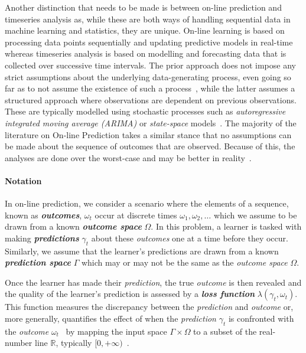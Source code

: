 Another distinction that needs to be made is between on-line prediction and timeseries analysis as, while these are both ways of handling sequential data in machine learning and statistics, they are unique. On-line learning is based on processing data points sequentially and updating predictive models in real-time whereas timeseries analysis is based on modelling and forecasting data that is collected over successive time intervals. The prior approach does not impose any strict assumptions about the underlying data-generating process, even going so far as to not assume the existence of such a process~\cite{vovk:2001}, while the latter assumes a structured approach where observations are dependent on previous observations. These are typically modelled using stochastic processes such as \textit{autoregressive integrated moving average (ARIMA)} or \textit{state-space} models~\cite{box:2015}. The majority of the literature on On-line Prediction takes a similar stance that no assumptions can be made about the sequence of outcomes that are observed. Because of this, the analyses are done over the worst-case and may be better in reality~\cite{cesa-bianchi:1997}.

\paragraph*{Notation}
In on-line prediction, we consider a scenario where the elements of a sequence, known as \textit{\textbf{outcomes}}, $\omega_t$ occur at discrete times $\omega_1, \omega_2, \ldots$ which we assume to be drawn from a known \textit{\textbf{outcome space}} $\Omega$. In this problem, a learner is tasked with making \textit{\textbf{predictions}} $\gamma_t$ about these \textit{outcomes} one at a time before they occur. Similarly, we assume that the learner's predictions are drawn from a known \textit{\textbf{prediction space}} $\Gamma$ which may or may not be the same as the \textit{outcome space} $\Omega$.

Once the learner has made their \textit{prediction}, the true \textit{outcome} is then revealed and the quality of the learner's prediction is assessed by a \textit{\textbf{loss function}} $\lambda(\gamma_t, \omega_t)$. This function measures the discrepancy between the \textit{prediction} and \textit{outcome} or, more generally, quantifies the effect of when the \textit{prediction} $\gamma_t$ is confronted with the \textit{outcome} $\omega_t$~\cite{adamskiy:2019} by mapping the input space $\Gamma \times \Omega$ to a subset of the real-number line $\mathbb{R}$, typically $[0, +\infty)$~\cite{kalnishkan:2009}.

